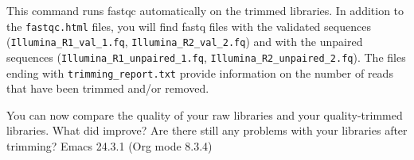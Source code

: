 \documentclass[11pt]{article}
\begin{document}
This command runs fastqc automatically on the trimmed libraries. In addition
to the \texttt{fastqc.html} files, you will find fastq files with the validated
sequences (\texttt{Illumina\_R1\_val\_1.fq}, \texttt{Illumina\_R2\_val\_2.fq}) and with the
unpaired sequences (\texttt{Illumina\_R1\_unpaired\_1.fq}, \texttt{Illumina\_R2\_unpaired\_2.fq}).
The files ending with \texttt{trimming\_report.txt} provide information on the number
of reads that have been trimmed and/or removed.

You can now compare the quality of your raw libraries and your
quality-trimmed libraries. What did improve? Are there still any
problems with your libraries after trimming?
Emacs 24.3.1 (Org mode 8.3.4)
\end{document}
